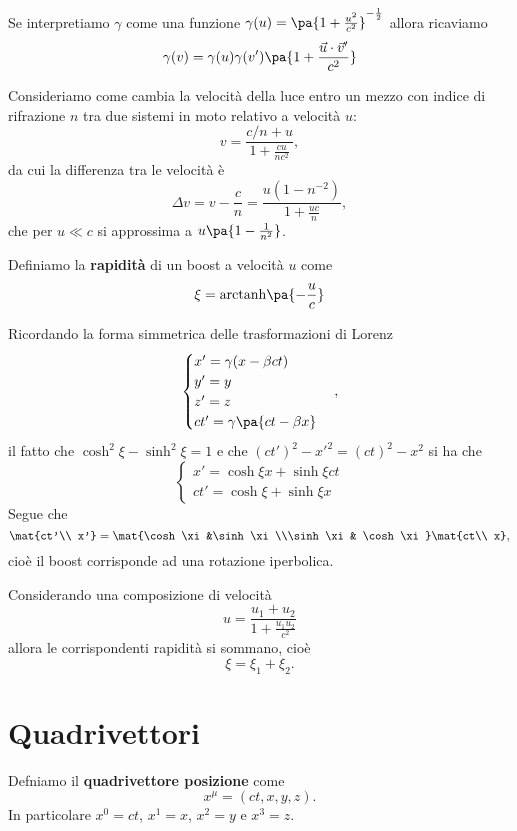 \begin{remark}
Se interpretiamo $\gamma$ come una funzione $\gamma(u)=\pa{1+\frac{u^2}{c^2}}^{-\frac12}$ allora ricaviamo
\[\gamma(v)=\gamma(u)\gamma(v')\pa{1+\frac{\vec u\cdot \vec v'}{c^2}}\]
\end{remark}


\begin{example}
Consideriamo come cambia la velocit\`a della luce entro un mezzo con indice di rifrazione $n$ tra due sistemi in moto relativo a velocit\`a $u$:
\[v=\frac{c/n+u}{1+\frac{cu}{nc^2}},\]
da cui la differenza tra le velocit\`a \`e
\[\Delta v=v-\frac cn=\frac{u(1-n^{-2})}{1+\frac{uc}n},\]
che per $u\ll c$ si approssima a $u\pa{1-\frac1{n^2}}$.
\end{example}

\begin{definition}[Rapidit\`a]
Definiamo la \textbf{rapidit\`a} di un boost a velocit\`a $u$ come
\[\xi=\mathrm{arctanh}\pa{-\frac uc}\]
\end{definition}
\noindent
Ricordando la forma simmetrica delle trasformazioni di Lorenz
\[\begin{cases}
x'=\gamma (x-\beta ct)\\
y'=y\\
z'=z\\
ct'=\gamma\pa{ct-\beta x}
\end{cases},\]
il fatto che $\cosh^2\xi-\sinh^2\xi=1$ e che $(ct')^2-x'^2=(ct)^2-x^2$ si ha che
\[\begin{cases}
x'=\cosh\xi x+\sinh\xi ct\\
ct'=\cosh \xi +\sinh\xi x
\end{cases}\]
Segue che
\[\mat{ct'\\ x'}=\mat{\cosh \xi &\sinh \xi\\\sinh \xi & \cosh \xi}\mat{ct\\ x},\]
cio\`e il boost corrisponde ad una rotazione iperbolica.

\begin{remark}
Considerando una composizione di velocit\`a 
\[u=\dfrac{u_1+u_2}{1+\frac{u_1u_2}{c^2}}\]
allora le corrispondenti rapidit\`a si sommano, cio\`e
\[\xi=\xi_1+\xi_2.\]
\end{remark}

\section{Quadrivettori}
\begin{definition}[Quadrivettore]
Defniamo il \textbf{quadrivettore posizione} come
\[x^\mu=(ct,x,y,z).\]
In particolare $x^0=ct$, $x^1=x$, $x^2=y$ e $x^3=z$.
\end{definition}

